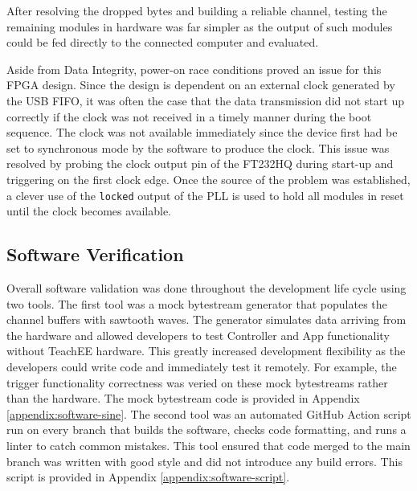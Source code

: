 \documentclass[letterpaper,11pt]{article}
\newcommand{\code}[1]{\texttt{#1}}
\begin{document}
After resolving the dropped bytes and building a reliable channel, testing the
remaining modules in hardware was far simpler as the output of such modules
could be fed directly to the connected computer and evaluated.

Aside from Data Integrity, power-on race conditions proved an issue for this
FPGA design. Since the design is dependent on an external clock generated by the
USB FIFO, it was often the case that the data transmission did not start up
correctly if the clock was not received in a timely manner during the boot
sequence. The clock was not available immediately since the device first had be
set to synchronous mode by the software to produce the clock. This issue was
resolved by probing the clock output pin of the FT232HQ during start-up and
triggering on the first clock edge. Once the source of the problem was
established, a clever use of the \code{locked} output of the PLL is used to hold
all modules in reset until the clock becomes available.

\subsection{Software Verification} \label{sec:software-verification} %
Overall software validation was done throughout the development life cycle using
two tools. The first tool was a mock bytestream generator that populates the channel
buffers with sawtooth waves. The generator simulates data arriving from the hardware
and allowed developers to test Controller and App functionality without TeachEE
hardware. This greatly increased development flexibility as the developers could
write code and immediately test it remotely. For example, the trigger functionality
correctness was veried on these mock bytestreams rather than the hardware. The mock
bytestream code is provided in Appendix \ref{appendix:software-sine}. The
second tool was an automated GitHub Action script run on every branch that builds the
software, checks code formatting, and runs a linter to catch common mistakes. This
tool ensured that code merged to the main branch was written with good style and did
not introduce any build errors. This script is provided in Appendix
\ref{appendix:software-script}.
\end{document}
